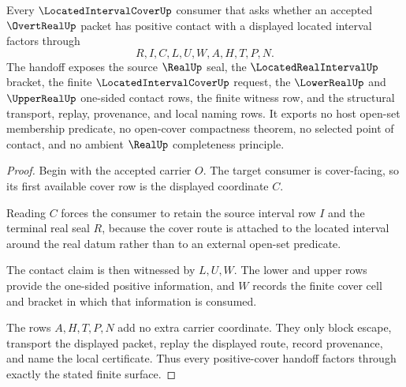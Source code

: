 \begin{theorem}
\label{thm:overt-real-positive-cover-handoff}
Every $\LocatedIntervalCoverUp$ consumer that asks whether an accepted $\OvertRealUp$ packet has positive contact with a displayed located interval factors through
$$
R,I,C,L,U,W,A,H,T,P,N .
$$
The handoff exposes the source $\RealUp$ seal, the $\LocatedRealIntervalUp$ bracket, the finite $\LocatedIntervalCoverUp$ request, the $\LowerRealUp$ and $\UpperRealUp$ one-sided contact rows, the finite witness row, and the structural transport, replay, provenance, and local naming rows. It exports no host open-set membership predicate, no open-cover compactness theorem, no selected point of contact, and no ambient $\RealUp$ completeness principle.
\end{theorem}
\begin{proof}
Begin with the accepted carrier $O$. The target consumer is cover-facing, so its first available cover row is the displayed coordinate $C$.

Reading $C$ forces the consumer to retain the source interval row $I$ and the terminal real seal $R$, because the cover route is attached to the located interval around the real datum rather than to an external open-set predicate.

The contact claim is then witnessed by $L,U,W$. The lower and upper rows provide the one-sided positive information, and $W$ records the finite cover cell and bracket in which that information is consumed.

The rows $A,H,T,P,N$ add no extra carrier coordinate. They only block escape, transport the displayed packet, replay the displayed route, record provenance, and name the local certificate. Thus every positive-cover handoff factors through exactly the stated finite surface.
\end{proof}


